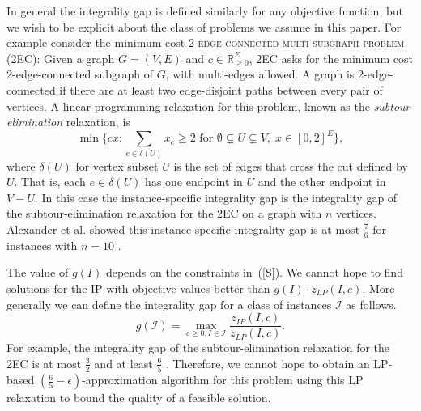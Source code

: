 In general the integrality gap is defined similarly for any objective function, but we wish to be explicit about the class of problems we assume in this paper. For example consider the minimum cost \textsc{2-edge-connected multi-subgraph problem (2EC)}: Given a graph $G=(V,E)$ and $c\in \mathbb{R}^E_{\geq 0}$, 2EC asks for the minimum cost 2-edge-connected subgraph of $G$, with multi-edges allowed. A graph is 2-edge-connected if there are at least two edge-disjoint paths between every pair of vertices.  A linear-programming relaxation for this problem, known as the {\em subtour-elimination} relaxation, is
 \begin{equation}\min \{cx: \sum_{e\in \delta(U)}x_e \geq 2 \mbox{ for } \emptyset \subsetneq U \subsetneq V,\; x\in [0,2]^{E}\}, 
 \label{eq:subtour}
 \end{equation}
where $\delta(U)$ for vertex subset $U$ is the set of edges that cross the cut defined by $U$.  That is, each $e \in \delta(U)$ has one endpoint in $U$ and the other endpoint in $V-U$.
 In this case the instance-specific integrality gap is the integrality gap of the subtour-elimination relaxation for the 2EC on a graph with $n$ vertices. Alexander et al. \cite{alexander2006integrality} showed this instance-specific integrality gap
is at most $\frac{7}{6}$ for instances with $n= 10$ .

The value of $g(I)$ depends on the constraints in~(\ref{S}).  We cannot hope to find solutions for the IP with objective values better than $g(I)\cdot z_{LP}(I,c)$. More generally we can define the integrality gap for a class of instances $\mathcal{I}$ as follows.%
\begin{equation}\label{gapproblem}
g(\mathcal{I}) = \max_{c\geq 0 , I\in\mathcal{I}}\frac{z_{IP}(I,c)}{z_{LP}(I,c)}.
\end{equation}
For example, the integrality gap of the subtour-elimination relaxation for the 2EC is at most $\frac{3}{2}$ \cite{wolsey} and at least $\frac{6}{5}$ \cite{alexander2006integrality}. Therefore, we cannot hope to obtain an LP-based $(\frac{6}{5}-\epsilon)$-approximation algorithm for this problem using this LP relaxation to bound the quality of a feasible solution.

